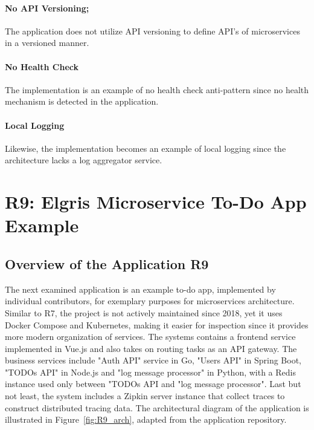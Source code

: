 \documentclass{Configuration_Files/PoliMi3i_thesis}
\begin{document}
\paragraph{No API Versioning;} The application does not utilize API versioning to define API's of microservices in a versioned manner.

\paragraph{No Health Check} The implementation is an example of no health check anti-pattern since no health mechanism is detected in the application.

\paragraph{Local Logging} Likewise, the implementation becomes an example of local logging since the architecture lacks a log aggregator service.

\section{R9: Elgris Microservice To-Do App Example}
\label{sec:R9}

\subsection{Overview of the Application R9}
\label{subsec:R9_overview}

The next examined application is an example to-do app, implemented by individual contributors, for exemplary purposes for microservices architecture.
Similar to R7, the project is not actively maintained since 2018, yet it uses Docker Compose and Kubernetes, making it easier for inspection since it provides more modern organization of services.
The systems contains a frontend service implemented in Vue.js and also takes on routing tasks as an API gateway.
The business services include "Auth API" service in Go, "Users API" in Spring Boot, "TODOs API" in Node.js and "log message processor" in Python, with a Redis instance used only between "TODOs API and "log message processor".
Last but not least, the system includes a Zipkin server instance that collect traces to construct distributed tracing data.
The architectural diagram of the application is illustrated in Figure~\ref{fig:R9_arch}, adapted from the application repository.
\end{document}
